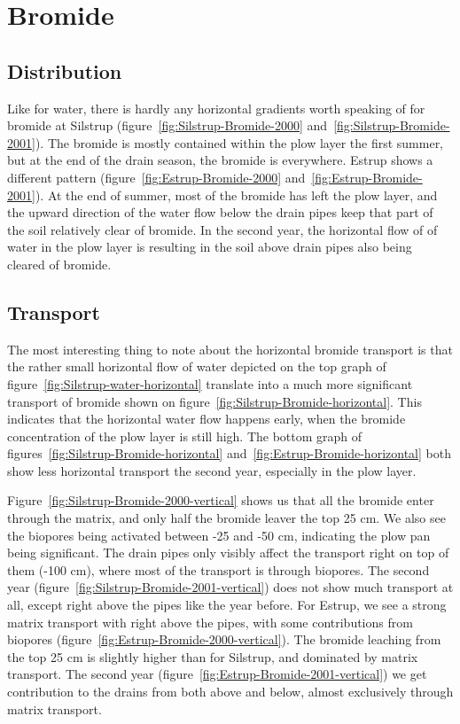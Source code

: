 \FloatBarrier
\section{Bromide}

\subsection{Distribution}

Like for water, there is hardly any horizontal gradients worth
speaking of for bromide at Silstrup
(figure~\ref{fig:Silstrup-Bromide-2000}
and~\ref{fig:Silstrup-Bromide-2001}).  The bromide is mostly contained
within the plow layer the first summer, but at the end of the drain
season, the bromide is everywhere.  Estrup shows a different pattern
(figure~\ref{fig:Estrup-Bromide-2000}
and~\ref{fig:Estrup-Bromide-2001}).  At the end of summer, most of the
bromide has left the plow layer, and the upward direction of the water
flow below the drain pipes keep that part of the soil relatively clear
of bromide.  In the second year, the horizontal flow of of water in
the plow layer is resulting in the soil above drain pipes also being
cleared of bromide.

\subsection{Transport}

The most interesting thing to note about the horizontal bromide
transport is that the rather small horizontal flow of water depicted
on the top graph of figure~\ref{fig:Silstrup-water-horizontal}
translate into a much more significant transport of bromide shown on
figure~\ref{fig:Silstrup-Bromide-horizontal}.  This indicates that the
horizontal water flow happens early, when the bromide concentration of
the plow layer is still high.  The bottom graph of
figures~\ref{fig:Silstrup-Bromide-horizontal}
and~\ref{fig:Estrup-Bromide-horizontal} both show less horizontal transport
the second year, especially in the plow layer.

Figure~\ref{fig:Silstrup-Bromide-2000-vertical} shows us that all the
bromide enter through the matrix, and only half the bromide leaver the
top 25 cm.  We also see the biopores being activated between -25 and
-50 cm, indicating the plow pan being significant.  The drain pipes
only visibly affect the transport right on top of them (-100 cm),
where most of the transport is through biopores.  The second year
(figure~\ref{fig:Silstrup-Bromide-2001-vertical}) does not show much
transport at all, except right above the pipes like the year before.  For
Estrup, we see a strong matrix transport with right above the pipes, with
some contributions from biopores
(figure~\ref{fig:Estrup-Bromide-2000-vertical}).  The bromide leaching
from the top 25 cm is slightly higher than for Silstrup, and dominated
by matrix transport.  The second year
(figure~\ref{fig:Estrup-Bromide-2001-vertical}) we get contribution to
the drains from both above and below, almost exclusively through
matrix transport.


